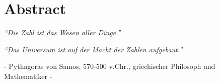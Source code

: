 %
%
\chapter{Abstract}


\begin{center}
    {\itshape ``Die Zahl ist das Wesen aller Dinge.''}
    
    {\itshape ``Das Universum ist auf der Macht der Zahlen aufgebaut.''}
    
    - Pythagoras von Samos, 570-500 v.Chr., griechischer Philosoph und Mathematiker -
\end{center}

\newpage
